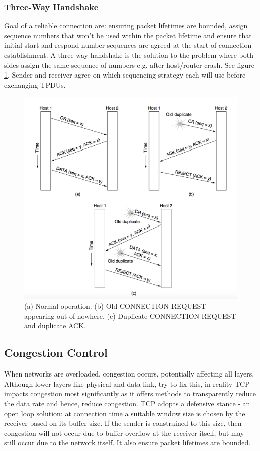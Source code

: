 \documentclass[twoside]{article}
\begin{document}
\subsubsection{Three-Way Handshake}
Goal of a reliable connection are: ensuring packet lifetimes are bounded, assign
sequence numbers that won't be used within the packet lifetime and ensure that 
initial start and respond number sequences are agreed at the start of connection
establishment. A three-way handshake is the solution to the problem where both
sides assign the same sequence of numbers e.g. after host/router crash. See 
figure \ref{fig:three-way-handshake}. Sender and receiver agree on which 
sequencing strategy each will use before exchanging TPDUs.
\begin{figure}
  \includegraphics[width=\linewidth]{three-way-handshake.png}
  \caption{(a) Normal operation. (b) Old CONNECTION REQUEST appearing out of 
  nowhere. (c) Duplicate CONNECTION REQUEST and duplicate ACK.}
  \label{fig:three-way-handshake}
\end{figure}
\subsection{Congestion Control}
When networks are overloaded, congestion occurs, potentially affecting all 
layers. Although lower layers like physical and data link, try to fix this,
in reality TCP impacts congestion most significantly as it offers methods to 
transparently reduce the data rate and hence, reduce congestion. TCP adopts
a defensive stance - an open loop solution: at connection time a suitable 
window size is chosen by the receiver based on its buffer size. If the sender
is constrained to this size, then congestion will not occur due to buffer
overflow at the receiver itself, but may still occur due to the network itself.
It also ensure packet lifetimes are bounded.
\end{document}
